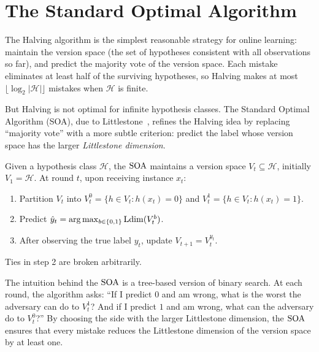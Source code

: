 
\section{The Standard Optimal Algorithm}
\label{sec:soa}

The Halving algorithm is the simplest reasonable strategy for online learning: maintain the version space (the set of hypotheses consistent with all observations so far), and predict the majority vote of the version space. Each mistake eliminates at least half of the surviving hypotheses, so Halving makes at most $\lfloor \log_2 |\mathcal{H}| \rfloor$ mistakes when $\mathcal{H}$ is finite.

But Halving is not optimal for infinite hypothesis classes. The Standard Optimal Algorithm (SOA), due to Littlestone~\cite{Littlestone1988}, refines the Halving idea by replacing ``majority vote'' with a more subtle criterion: predict the label whose version space has the larger \emph{Littlestone dimension}.

\begin{defn}
\label{def:soa}
  \leanok
Given a hypothesis class $\mathcal{H}$, the $\operatorname{SOA}$ maintains a version space $V_t \subseteq \mathcal{H}$, initially $V_1 = \mathcal{H}$. At round $t$, upon receiving instance $x_t$:
\begin{enumerate}[leftmargin=*, itemsep=2pt]
\item Partition $V_t$ into $V_t^0 = \{h \in V_t : h(x_t) = 0\}$ and $V_t^1 = \{h \in V_t : h(x_t) = 1\}$.
\item Predict $\hat{y}_t = \arg\max_{b \in \{0,1\}} \mathrm{Ldim}(V_t^b)$.
\item After observing the true label $y_t$, update $V_{t+1} = V_t^{y_t}$.
\end{enumerate}
Ties in step 2 are broken arbitrarily.
\end{defn}

The intuition behind the $\operatorname{SOA}$ is a tree-based version of binary search. At each round, the algorithm asks: ``If I predict $0$ and am wrong, what is the worst the adversary can do to $V_t^1$? And if I predict $1$ and am wrong, what can the adversary do to $V_t^0$?'' By choosing the side with the larger Littlestone dimension, the $\operatorname{SOA}$ ensures that every mistake reduces the Littlestone dimension of the version space by at least one.

